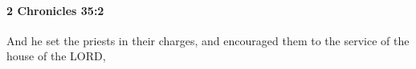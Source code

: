 
		\paragraph{2 Chronicles 35:2} %
			\label{2CHRONICLES-35-2}

			And he set the priests in their charges, and encouraged them to the service of the house of the LORD,


